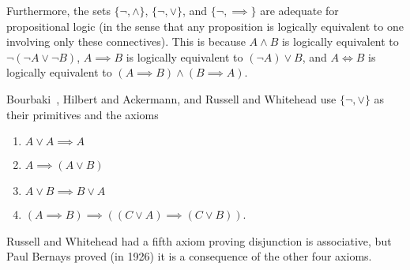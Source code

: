 \begin{node}[Semantics]
\begin{node}
Furthermore, the sets $\{\neg,\land\}$, $\{\neg,\lor\}$, and $\{\neg,\implies\}$
are adequate for propositional logic (in the sense that any proposition
is logically equivalent to one involving only these connectives). This
is because $A\land B$ is logically equivalent to $\neg(\neg A\lor\neg B)$,
$A\implies B$ is logically equivalent to $(\neg A)\lor B$, and $A\iff B$
is logically equivalent to $(A\implies B)\land(B\implies A)$.

\begin{node}\label{prop:semantics-0004}%
Bourbaki~\cite{bourbaki1968theory}, Hilbert and Ackermann, and Russell
and Whitehead use $\{\neg,\lor\}$ as their primitives and the axioms
\begin{enumerate}
\item $A\lor A\implies A$
\item $A\implies(A\lor B)$
\item $A\lor B\implies B\lor A$
\item $(A\implies B)\implies((C\lor A)\implies(C\lor B))$.
\end{enumerate}
Russell and Whitehead had a fifth axiom proving disjunction is
associative, but Paul Bernays proved (in 1926) it is a consequence of the
other four axioms. 
\end{node}
\end{node}
\end{node}
